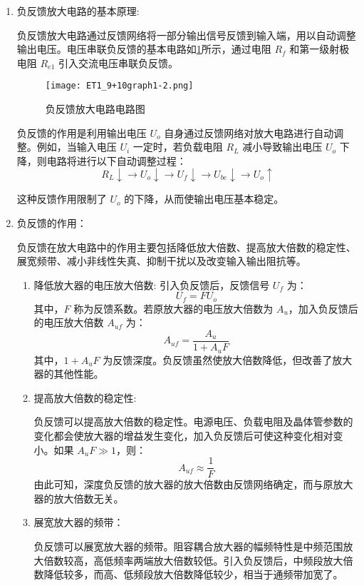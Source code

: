 \documentclass[dvipsnames, svgnames,a4paper,11pt]{article}
\begin{document}
		\begin{enumerate}
			\item 负反馈放大电路的基本原理:
			
				负反馈放大电路通过反馈网络将一部分输出信号反馈到输入端，用以自动调整输出电压。电压串联负反馈的基本电路如\cref{fig:fig1-2}所示，通过电阻 $R_f$ 和第一级射极电阻 $R_{e1}$ 引入交流电压串联负反馈。

				\begin{figure}[htbp]
					\centering
					\texttt{[image: ET1\_9+10graph1-2.png]}
					\caption{负反馈放大电路电路图}
					\label{fig:fig1-2}
				\end{figure}

				
				负反馈的作用是利用输出电压 $U_o$ 自身通过反馈网络对放大电路进行自动调整。例如，当输入电压 $U_i$ 一定时，若负载电阻 $R_L$ 减小导致输出电压 $U_o$ 下降，则电路将进行以下自动调整过程：
				\[
				R_L \downarrow \rightarrow U_o \downarrow \rightarrow U_f \downarrow \rightarrow U_{be} \downarrow \rightarrow U_o \uparrow
				\]
				
				这种反馈作用限制了 $U_o$ 的下降，从而使输出电压基本稳定。
			
			\item 负反馈的作用：
			
				负反馈在放大电路中的作用主要包括降低放大倍数、提高放大倍数的稳定性、展宽频带、减小非线性失真、抑制干扰以及改变输入输出阻抗等。

				\begin{enumerate}
					\item 降低放大器的电压放大倍数:
						引入负反馈后，反馈信号 $U_f$ 为：
						\[
						U_f = F U_o
						\]
						其中，$F$ 称为反馈系数。若原放大器的电压放大倍数为 $A_u$，加入负反馈后的电压放大倍数 $A_{uf}$ 为：
						\[
						A_{uf} = \frac{A_u}{1 + A_u F}
						\]
						其中，$1 + A_u F$ 为反馈深度。负反馈虽然使放大倍数降低，但改善了放大器的其他性能。

					\item 提高放大倍数的稳定性:
					
						负反馈可以提高放大倍数的稳定性。电源电压、负载电阻及晶体管参数的变化都会使放大器的增益发生变化，加入负反馈后可使这种变化相对变小。如果 $A_u F \gg 1$，则：
						\[
						A_{uf} \approx \frac{1}{F}
						\]
						由此可知，深度负反馈的放大器的放大倍数由反馈网络确定，而与原放大器的放大倍数无关。

					\item 展宽放大器的频带：

						负反馈可以展宽放大器的频带。阻容耦合放大器的幅频特性是中频范围放大倍数较高，高低频率两端放大倍数较低。引入负反馈后，中频段放大倍数降低较多，而高、低频段放大倍数降低较少，相当于通频带加宽了。


\end{enumerate}
\end{enumerate}
\end{document}
